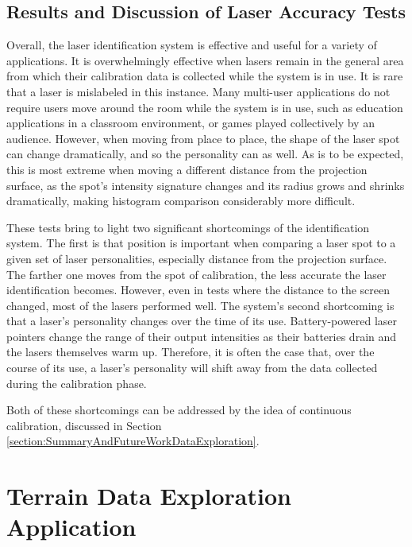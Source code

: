 \subsection{Results and Discussion of Laser Accuracy Tests}

Overall, the laser identification system is effective and useful for a
variety of applications. It is overwhelmingly effective when lasers
remain in the general area from which their calibration data is
collected while the system is in use. It is rare that a laser is
mislabeled in this instance. Many multi-user applications do not
require users move around the room while the system is in use, such as
education applications in a classroom environment, or games played
collectively by an audience. However, when moving from place to place,
the shape of the laser spot can change dramatically, and so the
personality can as well. As is to be expected, this is most extreme
when moving a different distance from the projection surface, as the
spot's intensity signature changes and its radius grows and shrinks
dramatically, making histogram comparison considerably more difficult.

These tests bring to light two significant shortcomings of the
identification system. The first is that position is important when
comparing a laser spot to a given set of laser personalities,
especially distance from the projection surface. The farther one moves
from the spot of calibration, the less accurate the laser
identification becomes. However, even in tests where the distance to
the screen changed, most of the lasers performed well. The system's
second shortcoming is that a laser's personality changes over the time
of its use. Battery-powered laser pointers change the range of their
output intensities as their batteries drain and the lasers themselves
warm up. Therefore, it is often the case that, over the course of its
use, a laser's personality will shift away from the data collected
during the calibration phase. 

Both of these shortcomings can be
addressed by the idea of continuous calibration, discussed in Section \ref{section:SummaryAndFutureWorkDataExploration}.


\section{Terrain Data Exploration Application}

